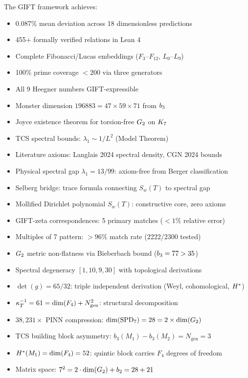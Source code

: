 The GIFT framework achieves:
\begin{itemize}
    \item 0.087\% mean deviation across 18 dimensionless predictions
    \item 455+ formally verified relations in Lean 4
    \item Complete Fibonacci/Lucas embeddings ($F_3$--$F_{12}$, $L_0$--$L_9$)
    \item 100\% prime coverage $< 200$ via three generators
    \item All 9 Heegner numbers GIFT-expressible
    \item Monster dimension $196883 = 47 \times 59 \times 71$ from $b_3$
    \item Joyce existence theorem for torsion-free $G_2$ on $K_7$
    \item TCS spectral bounds: $\lambda_1 \sim 1/L^2$ (Model Theorem)
    \item Literature axioms: Langlais 2024 spectral density, CGN 2024 bounds
    \item Physical spectral gap $\lambda_1 = 13/99$: axiom-free from Berger classification
    \item Selberg bridge: trace formula connecting $S_w(T)$ to spectral gap
    \item Mollified Dirichlet polynomial $S_w(T)$: constructive core, zero axioms
    \item GIFT-zeta correspondences: 5 primary matches ($< 1\%$ relative error)
    \item Multiples of 7 pattern: $> 96\%$ match rate (2222/2300 tested)
    \item $G_2$ metric non-flatness via Bieberbach bound ($b_3 = 77 > 35$)
    \item Spectral degeneracy $[1, 10, 9, 30]$ with topological derivations
    \item $\det(g) = 65/32$: triple independent derivation (Weyl, cohomological, $H^*$)
    \item $\kappa_T^{-1} = 61 = \mathrm{dim}(F_4) + N_{\mathrm{gen}}^2$: structural decomposition
    \item $38{,}231\times$ PINN compression: $\mathrm{dim}(\mathrm{SPD}_7) = 28 = 2 \times \mathrm{dim}(G_2)$
    \item TCS building block asymmetry: $b_3(M_1) - b_3(M_2) = N_{\mathrm{gen}} = 3$
    \item $H^*(M_1) = \mathrm{dim}(F_4) = 52$: quintic block carries $F_4$ degrees of freedom
    \item Matrix space: $7^2 = 2 \cdot \mathrm{dim}(G_2) + b_2 = 28 + 21$

\end{itemize}
